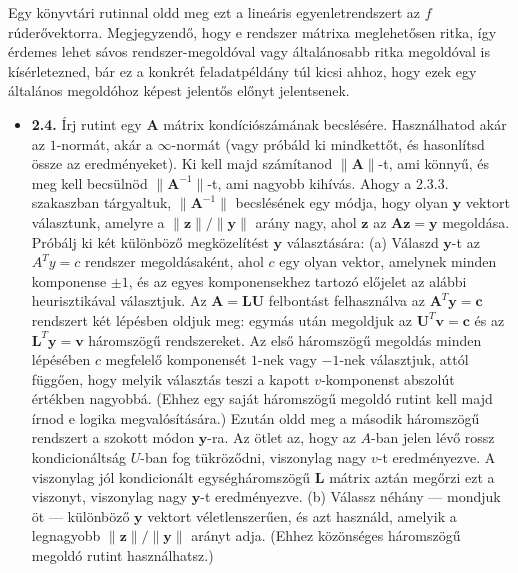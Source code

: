 \documentclass[
  magyar,
  11pt]{article}
\providecommand{\tightlist}{%
  \setlength{\itemsep}{0pt}\setlength{\parskip}{0pt}}
\providecommand{\boldsymbol}[1]{\mathbf{#1}}
\begin{document}
Egy könyvtári rutinnal oldd meg ezt a lineáris egyenletrendszert az
\(f\) rúderővektorra. Megjegyzendő, hogy e rendszer mátrixa meglehetősen
ritka, így érdemes lehet sávos rendszer-megoldóval vagy általánosabb
ritka megoldóval is kísérletezned, bár ez a konkrét feladatpéldány túl
kicsi ahhoz, hogy ezek egy általános megoldóhoz képest jelentős előnyt
jelentsenek.

\begin{itemize}
\tightlist
\item
  \textbf{2.4.} Írj rutint egy \(\boldsymbol{A}\) mátrix
  kondíciószámának becslésére. Használhatod akár az \(1\)-normát, akár a
  \(\infty\)-normát (vagy próbáld ki mindkettőt, és hasonlítsd össze az
  eredményeket). Ki kell majd számítanod \(\|\boldsymbol{A}\|\)-t, ami
  könnyű, és meg kell becsülnöd \(\|\boldsymbol{A}^{-1}\|\)-t, ami
  nagyobb kihívás. Ahogy a 2.3.3. szakaszban tárgyaltuk,
  \(\|\boldsymbol{A}^{-1}\|\) becslésének egy módja, hogy olyan
  \(\boldsymbol{y}\) vektort választunk, amelyre a
  \(\|\boldsymbol{z}\|/\|\boldsymbol{y}\|\) arány nagy, ahol
  \(\boldsymbol{z}\) az
  \(\boldsymbol{A}\boldsymbol{z} = \boldsymbol{y}\) megoldása. Próbálj
  ki két különböző megközelítést \(\boldsymbol{y}\) választására: (a)
  Válaszd \(\boldsymbol{y}\)-t az \(A^T y = c\) rendszer megoldásaként,
  ahol \(c\) egy olyan vektor, amelynek minden komponense \(\pm 1\), és
  az egyes komponensekhez tartozó előjelet az alábbi heurisztikával
  választjuk. Az \(\mathbf{A} = \mathbf{L}\mathbf{U}\) felbontást
  felhasználva az \(\mathbf{A}^T \mathbf{y} = \mathbf{c}\) rendszert két
  lépésben oldjuk meg: egymás után megoldjuk az
  \(\mathbf{U}^T \mathbf{v} = \mathbf{c}\) és az
  \(\mathbf{L}^T \mathbf{y} = \mathbf{v}\) háromszögű rendszereket. Az
  első háromszögű megoldás minden lépésében \(c\) megfelelő komponensét
  \(1\)-nek vagy \(-1\)-nek választjuk, attól függően, hogy melyik
  választás teszi a kapott \(v\)-komponenst abszolút értékben nagyobbá.
  (Ehhez egy saját háromszögű megoldó rutint kell majd írnod e logika
  megvalósítására.) Ezután oldd meg a második háromszögű rendszert a
  szokott módon \(\boldsymbol{y}\)-ra. Az ötlet az, hogy az \(A\)-ban
  jelen lévő rossz kondicionáltság \(U\)-ban fog tükröződni, viszonylag
  nagy \(v\)-t eredményezve. A viszonylag jól kondicionált
  egységháromszögű \(\boldsymbol{L}\) mátrix aztán megőrzi ezt a
  viszonyt, viszonylag nagy \(\boldsymbol{y}\)-t eredményezve. (b)
  Válassz néhány --- mondjuk öt --- különböző \(\boldsymbol{y}\) vektort
  véletlenszerűen, és azt használd, amelyik a legnagyobb
  \(\|\boldsymbol{z}\|/\|\boldsymbol{y}\|\) arányt adja. (Ehhez
  közönséges háromszögű megoldó rutint használhatsz.)
\end{itemize}
\end{document}
